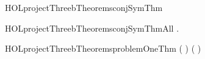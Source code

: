 \newcommand{\HOLprojectThreebDate}{26 July 2019}
\newcommand{\HOLprojectThreebTime}{22:07}
\begin{SaveVerbatim}{HOLprojectThreebTheoremsconjSymThm}
\HOLTokenTurnstile{}  \HOLSymConst{\HOLTokenConj{}}  \HOLSymConst{\HOLTokenEquiv{}}  \HOLSymConst{\HOLTokenConj{}} 
\end{SaveVerbatim}
\newcommand{\HOLprojectThreebTheoremsconjSymThm}{\UseVerbatim{HOLprojectThreebTheoremsconjSymThm}}
\begin{SaveVerbatim}{HOLprojectThreebTheoremsconjSymThmAll}
\HOLTokenTurnstile{} \HOLSymConst{\HOLTokenForall{}} .  \HOLSymConst{\HOLTokenConj{}}  \HOLSymConst{\HOLTokenEquiv{}}  \HOLSymConst{\HOLTokenConj{}} 
\end{SaveVerbatim}
\newcommand{\HOLprojectThreebTheoremsconjSymThmAll}{\UseVerbatim{HOLprojectThreebTheoremsconjSymThmAll}}
\begin{SaveVerbatim}{HOLprojectThreebTheoremsproblemOneThm}
\HOLTokenTurnstile{}  \HOLSymConst{\HOLTokenImp{}} ( \HOLSymConst{\HOLTokenImp{}} ) \HOLSymConst{\HOLTokenImp{}} ( \HOLSymConst{\HOLTokenImp{}} ) \HOLSymConst{\HOLTokenImp{}} 
\end{SaveVerbatim}
\newcommand{\HOLprojectThreebTheoremsproblemOneThm}{\UseVerbatim{HOLprojectThreebTheoremsproblemOneThm}}
\newcommand{\HOLprojectThreebTheorems}{
\HOLThmTag{project3b}{conjSymThm}\HOLprojectThreebTheoremsconjSymThm
\HOLThmTag{project3b}{conjSymThmAll}\HOLprojectThreebTheoremsconjSymThmAll
\HOLThmTag{project3b}{problem1Thm}\HOLprojectThreebTheoremsproblemOneThm
}
